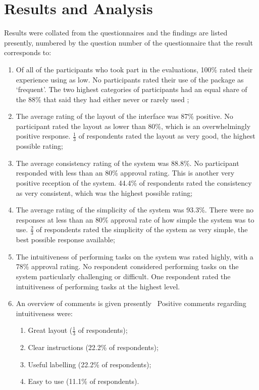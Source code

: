 \section{Results and Analysis}
Results were collated from the questionnaires and the findings are listed presently, numbered by the question number of the questionnaire that the result corresponds to:
\begin{enumerate}
	\item Of all of the participants who took part in the evaluations, 100\% rated their experience using \bibtex{} as low.  No participants rated their use of the package as `frequent'.  The two highest categories of participants had an equal share of the 88\% that said they had either never or rarely used \bibtex{};
	
	\item The average rating of the layout of the interface was 87\% positive.  No participant rated the layout as lower than 80\%, which is an overwhelmingly positive response.  $\frac{1}{3}$ of respondents rated the layout as very good, the highest possible rating;
	
	\item The average consistency rating of the system was 88.8\%.  No participant responded with less than an 80\% approval rating.  This is another very positive reception of the system.  44.4\% of respondents rated the consistency as very consistent, which was the highest possible rating;
	
	\item The average rating of the simplicity of the system was 93.3\%.  There were no responses at less than an 80\% approval rate of how simple the system was to use.  $\frac{2}{3}$ of respondents rated the simplicity of the system as very simple, the best possible response available;
	
	\item The intuitiveness of performing tasks on the system was rated highly, with a 78\% approval rating.  No respondent considered performing tasks on the system particularly challenging or difficult. One respondent rated the intuitiveness of performing tasks at the highest level.  
	
	\item An overview of comments is given presently \
	Positive comments regarding intuitiveness were:
	\begin{enumerate}
		\item Great layout ($\frac{1}{3}$ of respondents);
		\item Clear instructions (22.2\% of respondents);
		\item Useful labelling (22.2\% of respondents);
		\item Easy to use (11.1\% of respondents).
	\end{enumerate}
	

\end{enumerate}
